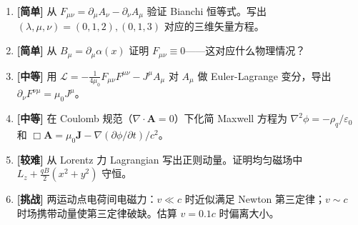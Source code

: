 \begin{enumerate}
  \item \textbf{[简单]} 从 $F_{\mu\nu} = \partial_\mu A_\nu - \partial_\nu A_\mu$ 验证 Bianchi 恒等式。写出 $(\lambda,\mu,\nu)=(0,1,2),(0,1,3)$ 对应的三维矢量方程。
  \item \textbf{[简单]} 从 $B_\mu = \partial_\mu\alpha(x)$ 证明 $F_{\mu\nu} \equiv 0$——这对应什么物理情况？
  \item \textbf{[中等]} 用 $\mathcal{L} = -\frac{1}{4\mu_0}F_{\mu\nu}F^{\mu\nu} - J^\mu A_\mu$ 对 $A_\mu$ 做 Euler-Lagrange 变分，导出 $\partial_\nu F^{\nu\mu} = \mu_0 J^\mu$。
  \item \textbf{[中等]} 在 Coulomb 规范（$\nabla\cdot\mathbf{A}=0$）下化简 Maxwell 方程为 $\nabla^2\phi = -\rho_q/\varepsilon_0$ 和 $\Box\mathbf{A} = \mu_0\mathbf{J} - \nabla(\partial\phi/\partial t)/c^2$。
  \item \textbf{[较难]} 从 Lorentz 力 Lagrangian 写出正则动量。证明均匀磁场中 $L_z + \frac{qB}{2}(x^2+y^2)$ 守恒。
  \item \textbf{[挑战]} 两运动点电荷间电磁力：$v\ll c$ 时近似满足 Newton 第三定律；$v\sim c$ 时场携带动量使第三定律破缺。估算 $v=0.1c$ 时偏离大小。
\end{enumerate}
